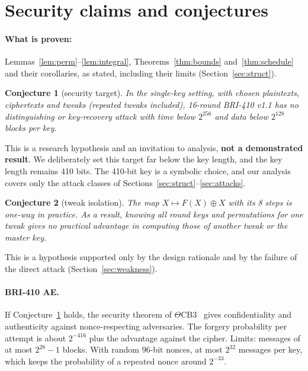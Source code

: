 \documentclass[11pt,a4paper]{article}
\newtheorem{conjecture}{Conjecture}
\begin{document}
\section{Security claims and conjectures}\label{sec:claims}

\paragraph{What is proven:} Lemmas~\ref{lem:perm}--\ref{lem:integral}, Theorems~\ref{thm:bounds}
and~\ref{thm:schedule} and their corollaries, as stated, including their limits (Section~\ref{sec:struct}).

\begin{conjecture}[security target]\label{conj:target}
In the single-key setting, with chosen plaintexts, ciphertexts and tweaks (repeated tweaks included), 16-round
BRI-410 v1.1 has no distinguishing or key-recovery attack with time below $2^{256}$ and data below $2^{128}$ blocks
per key.
\end{conjecture}

This is a research hypothesis and an invitation to analysis, \textbf{not a demonstrated result}. We deliberately set
this target far below the key length, and the key length remains 410 bits. The 410-bit key is a symbolic choice, and
our analysis covers only the attack classes of Sections~\ref{sec:struct}--\ref{sec:attacks}.

\begin{conjecture}[tweak isolation]\label{conj:isolation}
The map $X \mapsto F(X) \oplus X$ with its 8 steps is one-way in practice. As a result, knowing all round keys and
permutations for one tweak gives no practical advantage in computing those of another tweak or the master key.
\end{conjecture}

This is a hypothesis supported only by the design rationale and by the failure of the direct attack
(Section~\ref{sec:weakness}).

\paragraph{BRI-410 AE.} If Conjecture~\ref{conj:target} holds, the security theorem of $\Theta$CB3~\cite{KR11}
gives confidentiality and authenticity against nonce-respecting adversaries. The forgery probability per attempt is
about $2^{-416}$ plus the advantage against the cipher. Limits: messages of at most $2^{28} - 1$ blocks. With random
96-bit nonces, at most $2^{32}$ messages per key, which keeps the probability of a repeated nonce around $2^{-33}$.
\end{document}
